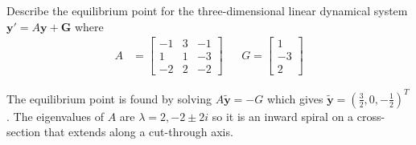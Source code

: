 \begin{Exercise}
Describe the equilibrium point for the three-dimensional linear dynamical system $\textbf{y}' = A\textbf{y} + \textbf{G}$ where
\begin{align*}
A &= 
\begin{bmatrix}
-1&3&-1\\ 
1&1&-3\\ 
-2&2&-2
\end{bmatrix}
& & G=
\begin{bmatrix}
1 \\
-3 \\
2
\end{bmatrix}
\end{align*}
\end{Exercise}
\begin{Answer}
The equilibrium point is found by solving $A\tilde{\textbf{y}} = -G$ which gives $\tilde{\textbf{y}} = (\frac{3}{2}, 0, -\frac{1}{2})^T$. The eigenvalues of $A$ are $\lambda = 2, -2\pm 2i$ so it is an inward spiral on a cross-section that extends along a cut-through axis.
\end{Answer}

